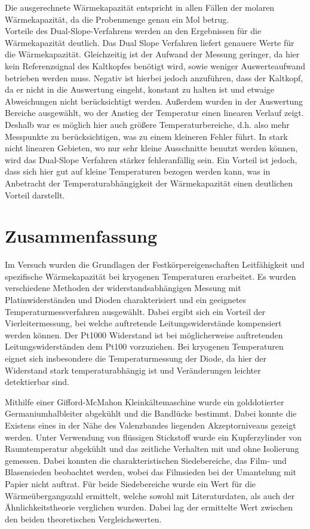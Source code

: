 \documentclass[parskip=half, a4paper,twoside,final]{article}
\begin{document}
Die ausgerechnete Wärmekapazität entspricht in allen Fällen der molaren Wärmekapazität, da die Probenmenge genau ein Mol betrug. \\
Vorteile des Dual-Slope-Verfahrens werden an den Ergebnissen für die Wärmekapazität deutlich. Das Dual Slope Verfahren liefert genauere Werte für die Wärmekapazität. Gleichzeitig ist der Aufwand der Messung geringer, da hier kein Referenzsignal des Kaltkopfes benötigt wird, sowie weniger Auswerteaufwand betrieben werden muss. Negativ ist hierbei jedoch anzuführen, dass der Kaltkopf, da er nicht in die Auswertung eingeht, konstant zu halten ist und etwaige Abweichungen nicht berücksichtigt werden. Außerdem wurden in der Auswertung Bereiche ausgewählt, wo der Anstieg der Temperatur einen linearen Verlauf zeigt. Deshalb war es möglich hier auch größere Temperaturbereiche, d.h. also mehr Messpunkte zu berücksichtigen, was zu einem kleineren Fehler führt. In stark nicht linearen Gebieten, wo nur sehr kleine Ausschnitte benutzt werden können, wird das Dual-Slope Verfahren stärker fehleranfällig sein. Ein Vorteil ist jedoch, dass sich hier gut auf kleine Temperaturen bezogen werden kann, was in Anbetracht der Temperaturabhängigkeit der Wärmekapazität einen deutlichen Vorteil darstellt.
\section{Zusammenfassung}
Im Versuch wurden die Grundlagen der Festkörpereigenschaften Leitfähigkeit und spezifische Wärmekapazität bei kryogenen Temperaturen erarbeitet. Es wurden verschiedene Methoden der widerstandsabhängigen Messung mit Platinwiderständen und Dioden charakterisiert und ein geeignetes Temperaturmessverfahren ausgewählt. Dabei ergibt sich ein Vorteil der Vierleitermessung, bei welche auftretende Leitungswiderstände kompensiert werden können. Der Pt1000 Widerstand ist bei möglicherweise auftretenden Leitungswiderständen dem Pt100 vorzuziehen. Bei kryogenen Temperaturen eignet sich insbesondere die Temperaturmessung der Diode, da hier der Widerstand stark temperaturabhängig ist und Veränderungen leichter detektierbar sind.

Mithilfe einer Gifford-McMahon Kleinkältemaschine wurde ein golddotierter Germaniumhalbleiter abgekühlt und die Bandlücke bestimmt. Dabei konnte die Existens eines in der Nähe des Valenzbandes liegenden Akzeptorniveaus gezeigt werden. Unter Verwendung von flüssigen Stickstoff wurde ein Kupferzylinder von Raumtemperatur abgekühlt und das zeitliche Verhalten mit und ohne Isolierung gemessen. Dabei konnten die charakteristischen Siedebereiche, das Film- und Blasensieden beobachtet werden, wobei das Filmsieden bei der Umantelung mit Papier nicht auftrat. Für beide Siedebereiche wurde ein Wert für die Wärmeübergangszahl ermittelt, welche sowohl mit Literaturdaten, als auch der Ähnlichkeitstheorie verglichen wurden. Dabei lag der ermittelte Wert zwischen den beiden theoretischen Vergleichswerten.
\end{document}

